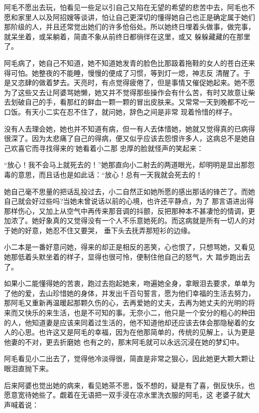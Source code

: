 \documentclass{article}
\begin{document}
阿毛不愿出去玩，怕看见一些足以引自己又陷在无望的希望的悲苦中去，阿毛也不愿和家里人以及阿招嫂等谈讲，怕让自己更深切的懂得她自己也正是确定属于她们那阶级的人，并且还常觉出她们的许多伧俗处。所以她终日埋着头做事，做完事，就呆坐着，或呆躺着，简直不象从前终日都徜徉在这里，或又
躲躲藏藏的在那里了。 


阿毛病了，她自己不知道，她不知道她发青的脸色比那趿着拖鞋的女人的苍白还来得可怕。她整夜的不能睡，慢慢的便成了习惯，等到灯一熄，神志反
\newpage
清醒了。于是又恣肆的做着梦去。天亮时，有点觉得疲倦了，但是事情又催促她起来。她不愿为了这些又去让阿婆骂她懒，她又并不觉得那些操作会有什么苦，有时又故意让柴去划破自己的手，看那红的鲜血一颗一颗的冒出皮肤来。又常常一天到晚都不吃一口饭。有天小二实在忍不住了，就问她，辞色之间是非常
现着怜惜的样子。 

没有人去理会她，她也并不知道有病，但一有人去体惜她，她就又觉得真的已病得很深了。因为太悲痛了自己的得病，便又似乎应该去怨恨许多人，这病总不是她自己欢喜它而寻找得来的'她看着小二那
忠厚的脸就怪声的笑起来： 

“放心！我不会马上就死去的！”她那直向小二射去的两道眼光，却明明是显出那怨毒的意思，而且话也是如此话：“放心！总有一天我就会死去的！

她自己毫不思量的把话乱投过去，小二自然正如她所愿的感出那话的锋芒了。而她自己就会好过些吗?当她未曾说话以前的心境，也许还平静点，为了
\newpage
那言语进出得那样伤心，又加上从空气中再传来那音调的抖颤，反把那种本不甚凄怆的情调，更加浓了。她好象真的又觉得没有一个人不乐意她死的。而这病就是所有一切人的对于她的好意，她忍不住又要哭，
垂下头去抚弄那短衫的边缘。 

小二本是一番好意问她，得来的却正是相反的恶笑，心也恨了，只想骂她，又看见她那低着头默坐着的样子，显得也很可怜，便制住他自己的怒气，大
踏步跑出去了。 

如果小二能懂得她的苦衷，跑过去抱起她来，吻遍她全身，拿眼泪去要求，单单为了他的爱，去山珍惜她的身体，并发出千百句誓言，愿为他们幸福的生活去努力，那阿毛又重新再温暖起那颗久伤的心，去再爱她的丈夫，去再为她丈夫的光明的将来而又快乐的来生活，也是不可知的事。无奈小二，他只是一个安分的粗心的种田的人，他知道妻是应该来同着过生活的，他不知道他却还应该去体会那隐秘着的女人的心思。也许这又是阿毛的幸福，因为在他那简单的，传统的见解上，认为更是他妻的不对，更去折磨她
\newpage
也有之的，那末阿毛就可以永远沉浸在她的梦幻中。

阿毛看见小二出去了，觉得他冷淡得很，简直是非常之狠心，因此她更大颗大颗让眼泪直抛下来。

后来阿婆也觉出她的病来，看见她茶不思，饭不想的，疑是有了喜，倒反快乐，也愿意宽待她些了。觑着在无语把一双手浸在凉水里洗衣服的阿毛，这
老婆子就大声喊着说： 
\end{document}
